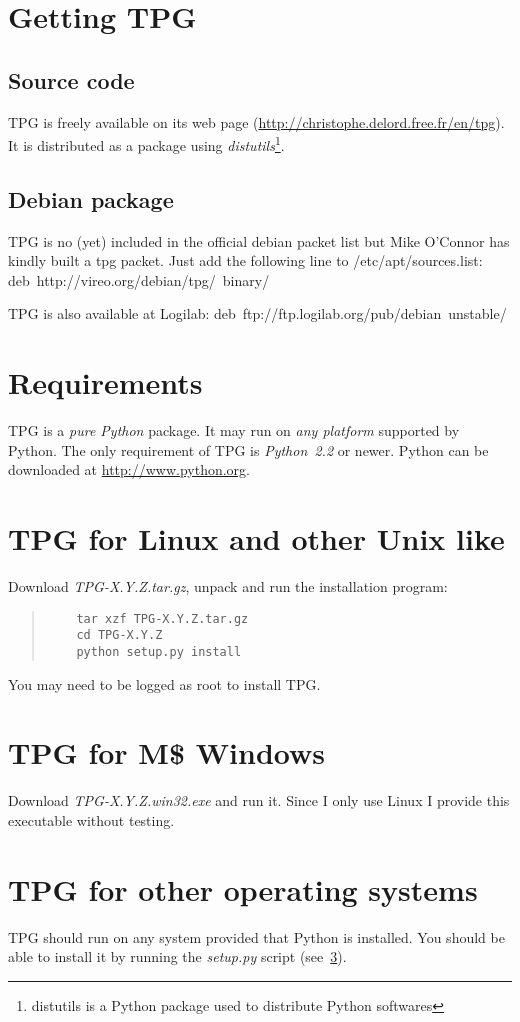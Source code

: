 
\section{Getting TPG}

\subsection{Source code}

TPG is freely available on its web page (\url{http://christophe.delord.free.fr/en/tpg}). It is distributed as a package using \emph{distutils}\footnote{distutils is a Python package used to distribute Python softwares}.

\subsection{Debian package}

TPG is no (yet) included in the official debian packet list but Mike O'Connor has kindly built a tpg packet. Just add the following line to /etc/apt/sources.list:
deb~http://vireo.org/debian/tpg/~binary/

TPG is also available at Logilab:
deb~ftp://ftp.logilab.org/pub/debian~unstable/

\section{Requirements}

TPG is a \emph{pure Python} package.
It may run on \emph{any platform} supported by Python.
The only requirement of TPG is \emph{Python~2.2} or newer. Python can be downloaded at \url{http://www.python.org}.

\section{TPG for Linux and other Unix like}                 \label{linux_install}

Download \mbox{\emph{TPG-X.Y.Z.tar.gz}}, unpack and run the installation program:
\begin{quote}
\begin{verbatim}
    tar xzf TPG-X.Y.Z.tar.gz
    cd TPG-X.Y.Z
    python setup.py install
\end{verbatim}
\end{quote}
You may need to be logged as root to install TPG.

\section{TPG for M\$ Windows}

Download \mbox{\emph{TPG-X.Y.Z.win32.exe}} and run it.
Since I only use Linux I provide this executable without testing.

\section{TPG for other operating systems}

TPG should run on any system provided that Python is installed. You should be able to install it by running the \mbox{\emph{setup.py}} script (see~\ref{linux_install}).
